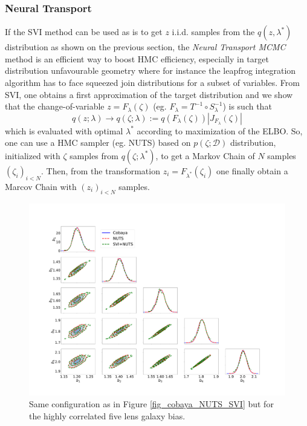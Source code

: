 \documentclass[twocolumn,twocolappendix,nofootinbib,iop]{openjournal}
\newcommand{\bydef}{:=}
\begin{document}
\subsubsection{Neural Transport}
\label{sec-Neural-Reparametrisation}
%
If the SVI method can be used as is to get $z$ i.i.d. samples from the $q(z,\lambda^\ast)$ distribution as shown on the previous section, the \textit{Neural Transport MCMC} method \citep{Parno2018,2019arXiv190303704H} is an efficient way to boost HMC efficiency, especially in target distribution unfavourable geometry where for instance the leapfrog integration algorithm has to face squeezed join distributions for a subset of variables. From SVI, one obtains a first approximation of the target distribution and we show that the change-of-variable $z=F_\lambda(\zeta)$ (eg. $F_\lambda=T^{-1}\circ S^{-1}_\lambda$) is such that
\begin{equation}
q(z;\lambda) \rightarrow q(\zeta;\lambda) \bydef q(F_\lambda(\zeta)) |J_{F_\lambda}(\zeta)|
\end{equation}
which is evaluated with optimal $\lambda^\ast$ according to maximization of the ELBO. So, one can use a HMC sampler (eg. NUTS) based on $p(\zeta;\mathcal{D})$ distribution, initialized with $\zeta$ samples from $q(\zeta;\lambda^\ast)$, to get a Markov Chain of $N$ samples $(\zeta_i)_{i<N}$. Then, from the transformation  $z_i=F_{\lambda^\ast}(\zeta_i)$ one finally obtain a Marcov Chain with $(z_i)_{i<N}$ samples. 
\begin{figure}
\centering
\includegraphics[width=1.5\columnwidth]{figures/fig_Cobaya-NUTS-SVI200_bis_v1.pdf}
\caption{Same configuration as in Figure \ref{fig_cobaya_NUTS_SVI} but for the highly correlated five lens galaxy bias.}
\label{fig_cobaya_NUTS_SVI_bis}
\end{figure}
\end{document}
